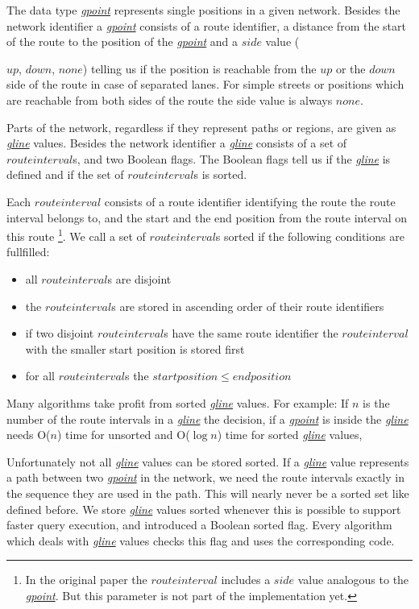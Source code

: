 \documentclass[a4paper]{article}
\newcommand{\dt}[1]{\textsl{\underline{#1}}}
\begin{document}
The data type \dt{gpoint} represents single positions in a given network. Besides the
network identifier a \dt{gpoint} consists of a route identifier, a distance from
the start of the route to the position of the \dt{gpoint} and a $side$ value
({$up$, $down$, $none$) telling us if the position is reachable from the $up$
or the $down$ side of the route in case of separated lanes. For simple
streets or positions which are reachable from both sides of the route the side
value is always $none$.

Parts of the network, regardless if they represent paths or regions, are given as
\dt{gline} values. Besides the network identifier a \dt{gline} consists of a set
of $route interval$s, and two Boolean flags. The Boolean flags tell us if the
\dt{gline} is defined and if the set of $route interval$s is sorted.

Each $route interval$ consists of a route identifier identifying the route
the route interval belongs to, and the start and the end position from the
route interval on this route
\footnote{In the original paper the $route interval$ includes a $side$ value
analogous to the \dt{gpoint}. But this parameter is not part of the implementation yet.}.
We call a \label{sec:sortedgline} set of $route interval$s sorted if the following
conditions are fullfilled:
\begin{itemize}
	\item all $route interval$s are disjoint
	\item the $route interval$s are stored in ascending order of their route identifiers
	\item if two disjoint $route interval$s have the same route identifier the
$route interval$ with the smaller start position is stored first
	\item for all $route interval$s the $start position \le end position$
\end{itemize}
Many algorithms take profit from sorted \dt{gline} values. For example: If $n$
is the number of the route intervals in a \dt{gline} the
decision, if a \dt{gpoint} is inside the \dt{gline} needs O($n$) time for unsorted
and O($\log n$) time for sorted \dt{gline} values,

Unfortunately not all \dt{gline} values can be stored sorted. If a \dt{gline}
value represents a path between two \dt{gpoint} in the network, we need the
route intervals exactly in the sequence they are used in the path. This will
nearly never be a sorted set like defined before.  We store \dt{gline}
values sorted whenever this is possible to support faster query execution, and
introduced a Boolean sorted flag. Every algorithm which deals with \dt{gline} values
checks this flag and uses the corresponding code.

}
\end{document}
